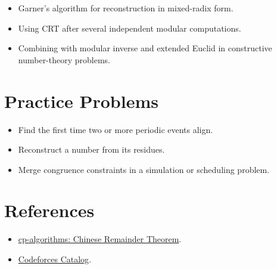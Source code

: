 \begin{itemize}
  \item Garner's algorithm for reconstruction in mixed-radix form.
  \item Using CRT after several independent modular computations.
  \item Combining with modular inverse and extended Euclid in constructive number-theory problems.
\end{itemize}

\section*{Practice Problems}

\begin{itemize}
  \item Find the first time two or more periodic events align.
  \item Reconstruct a number from its residues.
  \item Merge congruence constraints in a simulation or scheduling problem.
\end{itemize}

\section*{References}

\begin{itemize}
  \item \href{https://cp-algorithms.com/algebra/chinese-remainder-theorem.html}{cp-algorithms: Chinese Remainder Theorem}.
  \item \href{https://codeforces.com/catalog}{Codeforces Catalog}.
\end{itemize}
